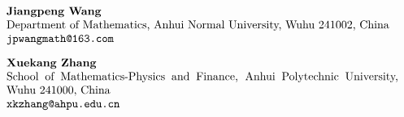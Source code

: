 \documentclass[12pt]{article}
\numberwithin{equation}{section}
\begin{document}
$\begin{array}{cc}
			\begin{minipage}[t]{1\textwidth}
				{\bf Jiangpeng Wang}\\
				Department of Mathematics, Anhui Normal University, Wuhu 241002, China\\
				\texttt{jpwangmath@163.com}
			\end{minipage}
			\hfill
		\end{array}$




$\begin{array}{cc}
			\begin{minipage}[t]{1\textwidth}
				{\bf Xuekang Zhang}\\
				School of Mathematics-Physics and Finance, Anhui Polytechnic University, Wuhu 241000, China\\
				\texttt{xkzhang@ahpu.edu.cn}
			\end{minipage}
			\hfill
		\end{array}$
\end{document}
